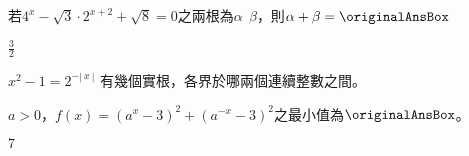 \begin{QUESTIONS}
\begin{QUESTION}
\begin{QBODY}
        若${{4}^{x}}-\sqrt{3}\cdot {{2}^{x+2}}+\sqrt{8}=0$之兩根為$\alpha \ \ \beta $，則$\alpha +\beta=\originalAnsBox $
    \end{QBODY}
    \begin{QFROMS}
    \end{QFROMS}
    \begin{QTAGS} \end{QTAGS}
    \begin{QANS}
        $\frac{3}{2}$
    \end{QANS}
    \begin{QSOL}
    \end{QSOL}
    \begin{QEMPTYSPACE}
    \end{QEMPTYSPACE}
\end{QUESTION}
\begin{QUESTION}
    \begin{QBODY}
        ${{x}^{2}}-1={{2}^{-|\ x\ |}}$ 有幾個實根，各界於哪兩個連續整數之間。
    \end{QBODY}
    \begin{QFROMS}
    \end{QFROMS}
    \begin{QTAGS} \end{QTAGS}
    \begin{QANS}
    \end{QANS}
    \begin{QSOL}
    \end{QSOL}
    \begin{QEMPTYSPACE}
    \end{QEMPTYSPACE}
\end{QUESTION}
\begin{QUESTION}
    \begin{QBODY}
        $a>0$，$f(x)={{({{a}^{x}}-3)}^{2}}+{{({{a}^{-x}}-3)}^{2}}$之最小值為$\originalAnsBox$。 
    \end{QBODY}
    \begin{QFROMS}
    \end{QFROMS}
    \begin{QTAGS} \end{QTAGS}
    \begin{QANS}
        $7$
    \end{QANS}
    \begin{QSOL}
    \end{QSOL}
    \begin{QEMPTYSPACE}
    \end{QEMPTYSPACE}

\end{QUESTION}
\end{QUESTIONS}
